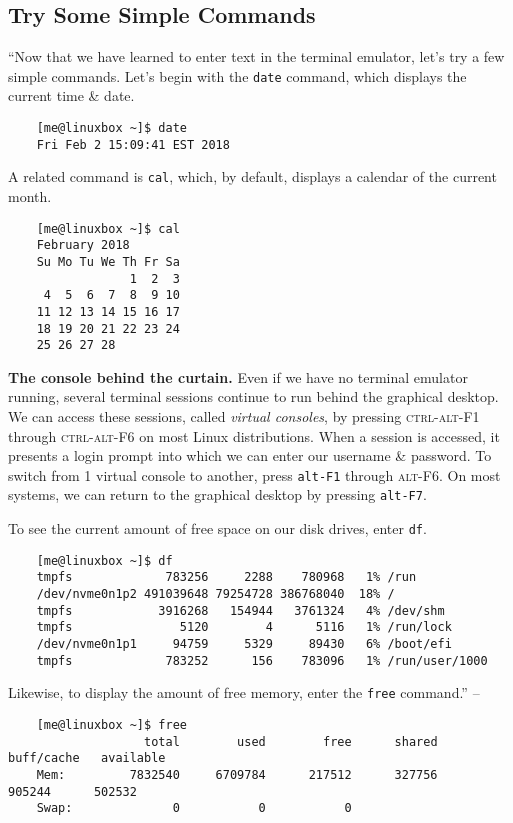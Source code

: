 \documentclass[oneside]{book}
\numberwithin{equation}{section}
\begin{document}
\subsection{Try Some Simple Commands}
``Now that we have learned to enter text in the terminal emulator, let's try a few simple commands. Let's begin with the \texttt{date} command, which displays the current time \& date.
\begin{verbatim}
	[me@linuxbox ~]$ date
	Fri Feb 2 15:09:41 EST 2018
\end{verbatim}
A related command is \texttt{cal}, which, by default, displays a calendar of the current month.
\begin{verbatim}
	[me@linuxbox ~]$ cal
	February 2018
	Su Mo Tu We Th Fr Sa
	             1  2  3
	 4  5  6  7  8  9 10
	11 12 13 14 15 16 17
	18 19 20 21 22 23 24
	25 26 27 28
\end{verbatim}
\textbf{The console behind the curtain.} Even if we have no terminal emulator running, several terminal sessions continue to run behind the graphical desktop. We can access these sessions, called \textit{virtual consoles}, by pressing \textsc{ctrl-alt-F1} through \textsc{ctrl-alt-F6}  on most Linux distributions. When a session is accessed, it presents a login prompt into which we can enter our username \& password. To switch from 1 virtual console to another, press \texttt{alt-F1} through \textsc{alt-F6}. On most systems, we can return to the graphical desktop by pressing \texttt{alt-F7}.

To see the current amount of free space on our disk drives, enter \texttt{df}.
\begin{verbatim}
	[me@linuxbox ~]$ df
	tmpfs             783256     2288    780968   1% /run
	/dev/nvme0n1p2 491039648 79254728 386768040  18% /
	tmpfs            3916268   154944   3761324   4% /dev/shm
	tmpfs               5120        4      5116   1% /run/lock
	/dev/nvme0n1p1     94759     5329     89430   6% /boot/efi
	tmpfs             783252      156    783096   1% /run/user/1000
\end{verbatim}
Likewise, to display the amount of free memory, enter the \texttt{free} command.'' -- \cite[pp. 41--42]{Shotts2019}
\begin{verbatim}
	[me@linuxbox ~]$ free
	               total        used        free      shared  buff/cache   available
	Mem:         7832540     6709784      217512      327756      905244      502532
	Swap:              0           0           0
\end{verbatim}
\end{document}
